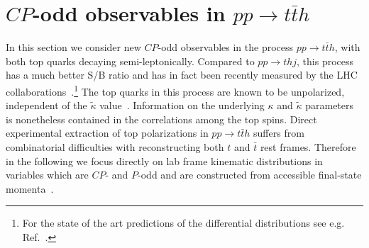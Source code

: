\documentclass[11pt,a4paper]{article}
\begin{document}
%
\section{$CP$-odd observables in $pp \to t \bar{t} h$}\label{sec:tth}
%
In this section we consider new $CP$-odd observables in the process $p p \to t \bar{t} h$, with both top quarks decaying semi-leptonically. Compared to $p p \to t  h j$, this process has a much better S/B ratio and has in fact been recently measured by the LHC collaborations~\cite{1712.08895, 1806.00425}.\footnote{For the state of the art predictions of the differential distributions see e.g. Ref.~\cite{1907.04343}.} 
The top quarks in this process are known to be unpolarized, independent of the $\tilde \kappa$ value~\cite{Ellis:2013yxa}. Information on the underlying $\kappa$ and $\tilde\kappa$ parameters is nonetheless contained in the correlations among the top spins. Direct experimental extraction of top polarizations in $p p \to t \bar{t} h$ suffers from combinatorial difficulties with reconstructing both $t$ and $\bar t$ rest frames. Therefore in the following we focus directly on lab frame kinematic distributions in variables which are $CP$- and $P$-odd and are constructed from accessible final-state momenta~\cite{Boudjema:2015nda}.


\end{document}
